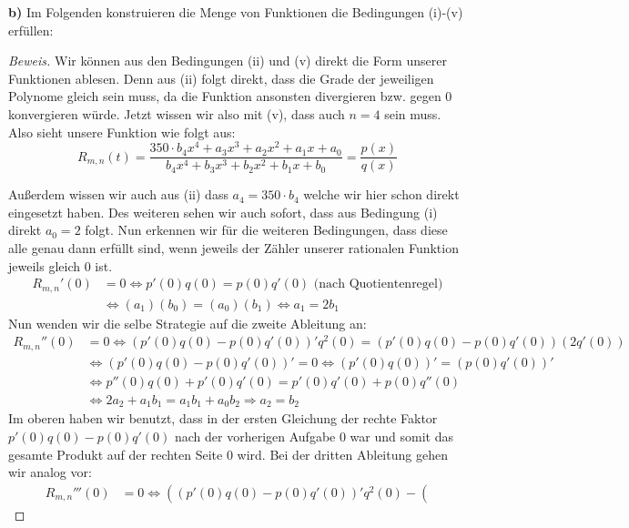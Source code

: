 \documentclass[a4paper]{article}
\begin{document}
\textbf{b)} Im Folgenden konstruieren die Menge von Funktionen die Bedingungen (i)-(v) erfüllen:
\begin{proof}[Beweis]
	Wir können aus den Bedingungen (ii) und (v) direkt die Form unserer Funktionen ablesen. Denn aus (ii)
	folgt direkt, dass die Grade der jeweiligen Polynome gleich sein muss, da die Funktion ansonsten
	divergieren bzw. gegen $0$  konvergieren würde. Jetzt wissen wir also mit (v), dass auch $n = 4$ sein
	muss. Also sieht unsere Funktion wie folgt aus:
	\[
		R_{m, n} (t) = \frac{ 
			350 \cdot b_4 x ^{4} + a_3 x ^{3} + a_2 x ^2 + a_1 x + a_0
			}{ 
			b_4 x ^{4} + b_3 x ^3 + b_2 x ^2 + b_1 x + b_0
		}
		= \frac{ p(x) }{ q(x) }
	\] 

	Außerdem wissen wir auch aus (ii) dass $a_4 = 350 \cdot b_4$ welche wir hier schon direkt eingesetzt haben.
	Des weiteren sehen wir auch sofort, dass aus Bedingung (i) direkt $a_0 = 2$ folgt.
	Nun erkennen wir für die weiteren Bedingungen, dass diese alle genau dann erfüllt sind, wenn jeweils 
	der Zähler unserer rationalen Funktion jeweils gleich 0 ist.
	\begin{align*}
		R_{m, n}'(0) &= 0 \Leftrightarrow p'(0)q(0) = p(0)q'(0) \text{ (nach Quotientenregel)} \\
				  &\Leftrightarrow (a_1)(b_0) = (a_0)(b_1)
				  \Leftrightarrow a_1 = 2 b_1
	\end{align*}
	Nun wenden wir die selbe Strategie auf die zweite Ableitung an:
	\begin{align*}
		R_{m, n} '' (0) &= 0 \Leftrightarrow \left(
				p'(0)q(0) - p(0)q'(0)
			\right) ' q ^2 (0) = \left(
				p'(0)q(0) - p(0)q'(0)
			\right) (2 q' (0)) \\
			&\Leftrightarrow \left(
				p'(0)q(0) - p(0)q'(0)
			\right) ' = 0
			\Leftrightarrow \left(
				p'(0)q(0)
			\right) ' = \left(
				p(0)q'(0)
			\right) ' \\
			&\Leftrightarrow {
				p''(0)q(0) + p'(0)q'(0)
			} = {
				p'(0)q'(0) + p(0)q''(0)
			} \\
			& \Leftrightarrow 2 a_2 + a_1 b_1 = a_1 b_1 + a_0 b_2
			\Rightarrow a_2 = b_2
	\end{align*}
	Im oberen haben wir benutzt, dass in der ersten Gleichung der rechte Faktor $p'(0)q(0) - p(0)q'(0)$
	nach der vorherigen Aufgabe 0 war und somit das gesamte Produkt auf der rechten Seite 0 wird.
	Bei der dritten Ableitung gehen wir analog vor:
	\begin{align*}
		R_{m, n} '''(0) &= 0 \Leftrightarrow \left(
			\left(
				p'(0)q(0) - p(0)q'(0)
			\right) ' q ^2 (0) - \left(

\end{align*}
\end{proof}
\end{document}
